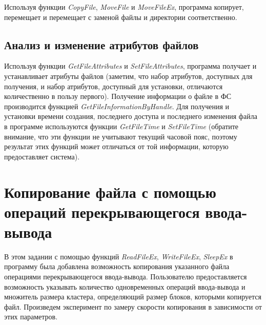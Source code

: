 \documentclass[a4paper,14pt]{extarticle}
\newcommand{\Code}[1]{\textit{#1}}
\begin{document}
Используя функции \Code{CopyFile}, \Code{MoveFile} и \Code{MoveFileEx},
программа копирует, перемещает и перемещает с заменой файлы и директории
соответственно.



\subsection{Анализ и изменение атрибутов файлов}

Используя функции \Code{GetFileAttributes} и \Code{SetFileAttributes},
программа получает и устанавливает атрибуты файлов (заметим, что набор
атрибутов, доступных для получения, и набор атрибутов, доступный для установки,
отличаются количественно в пользу первого). Получение информации о файле в ФС
производится функцией \Code{GetFileInformationByHandle}. Для получения и
установки времени создания, последнего доступа и последнего изменения файла в
программе используются функции \Code{GetFileTime} и \Code{SetFileTime}
(обратите внимание, что эти функции не учитывают текущий часовой пояс, поэтому
результат этих функций может отличаться от той информации, которую
предоставляет система).



\clearpage


\section{Копирование файла с помощью операций перекрывающегося ввода-вывода}

В этом задании с помощью функций \Code{ReadFileEx}, \Code{WriteFileEx},
\Code{SleepEx} в программу была добавлена возможность копирования указанного
файла операциями перекрывающегося ввода-вывода. Пользователю предоставляется
возможность указывать количество одновременных операций ввода-вывода и
множитель размера кластера, определяющий размер блоков, которыми копируется
файл. Произведем эксперимент по замеру скорости копирования
в зависимости от этих параметров.
\end{document}
